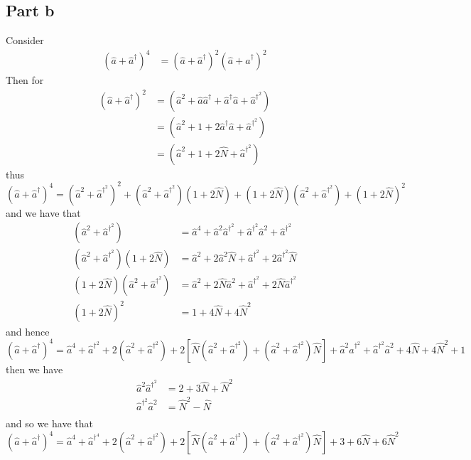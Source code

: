 \documentclass[12pt]{report}
\begin{document}
\subsection*{Part b}
Consider 
\begin{align*}
  (\hat{a} + \hat{a}^\dagger)^4 &=(\hat{a} + \hat{a}^\dagger)^2(\hat{a} + \hat{a}^\dagger)^2 
\end{align*}
Then for
\begin{align*}
  (\hat{a} + \hat{a}^\dagger)^2 &= (\hat{a}^2 + \hat{a}\hat{a}^\dagger + \hat{a}^\dagger \hat{a} + \hat{a}^{\dagger^2}) \\
                                &= (\hat{a}^2 + 1 + 2\hat{a}^\dagger \hat{a} + \hat{a}^{\dagger^2}) \\
                                &= (\hat{a}^2 + 1 + 2 \hat{N}+ \hat{a}^{\dagger^2}) 
\end{align*}
thus
\begin{equation*}
  (\hat{a} + \hat{a}^\dagger)^4 = (\hat{a}^2 + \hat{a}^{\dagger^2})^2 + (\hat{a}^2 + \hat{a}^{\dagger^2})(1 + 2\hat{N}) + (1 + 2\hat{N})(\hat{a}^2 + \hat{a}^{\dagger^2}) + (1 + 2\hat{N})^2
\end{equation*}
and we have that
\begin{align*}
  (\hat{a}^2 + \hat{a}^{\dagger^2}) &= \hat{a}^4 + \hat{a}^2 \hat{a}^{\dagger^2} + \hat{a}^{\dagger^2}\hat{a}^2 + \hat{a}^{\dagger^2} \\
  (\hat{a}^2 + \hat{a}^{\dagger^2})(1 + 2\hat{N}) &= \hat{a}^2 + 2\hat{a}^2\hat{N} + \hat{a}^{\dagger^2} + 2\hat{a}^{\dagger^2}\hat{N}\\
  (1 + 2\hat{N})(\hat{a}^2 + \hat{a}^{\dagger^2}) &= \hat{a}^2 + 2\hat{N}\hat{a}^2 + \hat{a}^{\dagger^2} + 2\hat{N}\hat{a}^{\dagger^2}\\
  (1 + 2\hat{N})^2 &= 1 + 4\hat{N} + 4\hat{N}^2
\end{align*}
and hence
\begin{equation*}
  (\hat{a} + \hat{a}^\dagger)^4 = \hat{a}^4 + \hat{a}^{\dagger^2} + 2 (\hat{a}^2 + \hat{a}^{\dagger^2}) + 2\left[\hat{N}(\hat{a}^2 + \hat{a}^{\dagger^2}) + (\hat{a}^2 + \hat{a}^{\dagger^2})\hat{N}\right] + \hat{a}^2\hat{a}^{\dagger^2} + \hat{a}^{\dagger^2}\hat{a}^2 + 4\hat{N} + 4\hat{N}^2 + 1
\end{equation*}
then we have
\begin{align*}
  \hat{a}^2 \hat{a}^{\dagger^2} &= 2 + 3\hat{N} + \hat{N}^2 \\
  \hat{a}^{\dagger^2} \hat{a}^2 &= \hat{N}^2 - \hat{N} \\
\end{align*}
and so we have that
\begin{equation*}
  (\hat{a} + \hat{a}^\dagger)^4 =\hat{a}^4 + \hat{a}^{\dagger^4} + 2 (\hat{a}^2 + \hat{a}^{\dagger^2}) + 2\left[\hat{N}(\hat{a}^2 + \hat{a}^{\dagger^2}) + (\hat{a}^2 + \hat{a}^{\dagger^2})\hat{N}\right] + 3 + 6\hat{N} + 6\hat{N}^2
\end{equation*}
\end{document}
